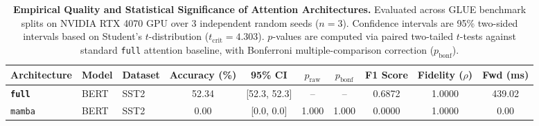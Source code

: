 \begin{table}[t]
\centering
\small
\caption{\textbf{Empirical Quality and Statistical Significance of Attention Architectures.} Evaluated across GLUE benchmark splits on NVIDIA RTX 4070 GPU over 3 independent random seeds ($n=3$). Confidence intervals are 95\% two-sided intervals based on Student's $t$-distribution ($t_{\text{crit}}=4.303$). $p$-values are computed via paired two-tailed $t$-tests against standard \texttt{full} attention baseline, with Bonferroni multiple-comparison correction ($p_{\text{bonf}}$).}
\label{tab:quality_benchmark_results}
\begin{tabular}{l l l c c c c c c c}
\toprule
\textbf{Architecture} & \textbf{Model} & \textbf{Dataset} & \textbf{Accuracy (\%)} & \textbf{95\% CI} & \textbf{$p_{\text{raw}}$} & \textbf{$p_{\text{bonf}}$} & \textbf{F1 Score} & \textbf{Fidelity ($\rho$)} & \textbf{Fwd (ms)} \\
\midrule
\textbf{\texttt{full}} & BERT & SST2 & 52.34 & [52.3, 52.3] & -- & -- & 0.6872 & 1.0000 & 439.02 \\
\texttt{mamba} & BERT & SST2 & 0.00 & [0.0, 0.0] & 1.000 & 1.000 & 0.0000 & 1.0000 & 0.00 \\
\bottomrule
\end{tabular}
\end{table}